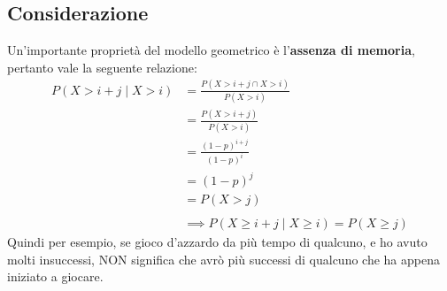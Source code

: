 \documentclass[11pt]{report}
\begin{document}
\subsection{Considerazione}
Un'importante proprietà del modello geometrico è l'\textbf{assenza di memoria}, pertanto vale la seguente relazione:
\begin{equation}
    \begin{split}
        P(X > i + j \mid X > i) & = \frac{P(X > i + j \cap X > i)}{P(X > i)}\\
        & = \frac{P(X > i + j)}{P(X > i)}\\
        & = \frac{(1-p)^{i+j}}{(1-p)^i}\\
        & = (1-p)^j\\
        & = P(X > j)\\
        \\
        & \implies P(X \geq i + j \mid X \geq i) = P(X \geq j)
    \end{split}
\end{equation}
Quindi per esempio, se gioco d'azzardo da più tempo di qualcuno, e ho avuto molti insuccessi, NON significa che avrò più successi di qualcuno che ha appena iniziato a giocare.
\end{document}
